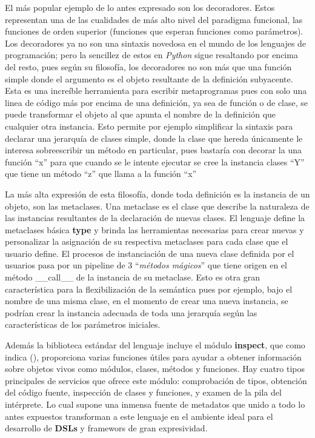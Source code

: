 El más popular ejemplo de lo antes expresado son los decoradores. Estos representan una de las
cualidades de más alto nivel del paradigma funcional, las funciones de orden superior (funciones
que esperan funciones como parámetros). Los decoradores ya no son una sintaxis novedosa en el
mundo de los lenguajes de programación; pero la sencillez de estos en {\it Python} sigue resaltando
por encima del resto, pues según su filosofía, los decoradores no son más que una función
simple donde el argumento es el objeto resultante de la definición subyacente. Esta es una
increíble herramienta para escribir metaprogramas pues con solo una linea de código más por
encima de una definición, ya sea de función o de clase, se puede transformar el objeto al que
apunta el nombre de la definición que cualquier otra instancia. Esto permite por ejemplo
simplificar la sintaxis para declarar una jerarquía de clases simple, donde la clase que hereda
únicamente le interesa sobreescribir un método en particular, pues bastaría con decorar la
una función ``x'' para que cuando se le intente ejecutar se cree la instancia clases ``Y''
que tiene un método ``z'' que llama a la función ``x''

La más alta expresión de esta filosofía, donde toda definición es la instancia de un objeto,
son las metaclases. Una metaclase es el clase que describe la naturaleza de las instancias
resultantes de la declaración de nuevas clases. El lenguaje define la metaclases básica
{\bf type} y brinda las herramientas necesarias para crear nuevas y personalizar la asignación
de su respectiva metaclases para cada clase que el usuario define. El procesos de instanciación
de una nueva clase definida por el usuarios pasa por un pipeline de 3 ``{\it métodos mágicos}'' que
tiene origen en el método \_\_call\_\_ de la instancia de su metaclase. Esto es otra gran
característica para la flexibilización de la semántica pues por ejemplo, bajo el nombre de una
misma clase, en el momento de crear una nueva instancia, se podrían crear la instancia adecuada
de toda una jerarquía según las características de los parámetros iniciales.

Además la biblioteca estándar del lenguaje incluye el módulo {\bf inspect}, que como indica (\cite{python}),
proporciona varias funciones útiles para ayudar a obtener información sobre objetos vivos
como módulos, clases, métodos y funciones. Hay cuatro tipos principales de servicios que ofrece
este módulo: comprobación de tipos, obtención del código fuente, inspección de clases y funciones,
y examen de la pila del intérprete. Lo cual supone una inmensa fuente de metadatos que unido
a todo lo antes expuestos transforman a este lenguaje en el ambiente ideal para el desarrollo de
    {\bf DSLs} y framewors de gran expresividad.

